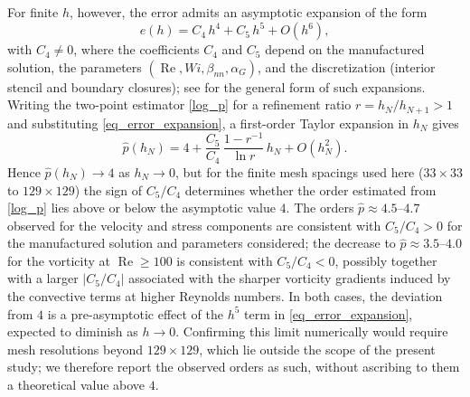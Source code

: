 \documentclass[preprint, 12pt]{elsarticle}
\begin{document}
For finite $h$, however, the error admits an asymptotic expansion of the form
\begin{equation}
    e(h) = C_4\, h^4 + C_5\, h^5 + O\left(h^6\right), \label{eq_error_expansion}
\end{equation}
with $C_4\neq0$, where the coefficients $C_4$ and $C_5$ depend on the manufactured solution, the parameters $(\operatorname{Re}, Wi, \beta_{nn}, \alpha_G)$, and the discretization (interior stencil and boundary closures); see \citet{leveque2007finite} for the general form of such expansions. Writing the two-point estimator \eqref{log_p} for a refinement ratio $r=h_N/h_{N+1}>1$ and substituting \eqref{eq_error_expansion}, a first-order Taylor expansion in $h_N$ gives
\begin{equation}
    \widehat{p}(h_N) = 4 + \frac{C_5}{C_4}\,\frac{1-r^{-1}}{\ln r}\,h_N + O\left(h_N^2\right). \label{eq_order_expansion}
\end{equation}
Hence $\widehat{p}(h_N)\to4$ as $h_N\to0$, but for the finite mesh spacings used here ($33\times33$ to $129\times129$) the sign of $C_5/C_4$ determines whether the order estimated from \eqref{log_p} lies above or below the asymptotic value $4$. The orders $\widehat{p}\approx4.5$--$4.7$ observed for the velocity and stress components are consistent with $C_5/C_4>0$ for the manufactured solution and parameters considered; the decrease to $\widehat{p}\approx3.5$--$4.0$ for the vorticity at $\operatorname{Re}\geq100$ is consistent with $C_5/C_4<0$, possibly together with a larger $\left|C_5/C_4\right|$ associated with the sharper vorticity gradients induced by the convective terms at higher Reynolds numbers. In both cases, the deviation from $4$ is a pre-asymptotic effect of the $h^5$ term in \eqref{eq_error_expansion}, expected to diminish as $h\to0$. Confirming this limit numerically would require mesh resolutions beyond $129\times129$, which lie outside the scope of the present study; we therefore report the observed orders as such, without ascribing to them a theoretical value above $4$.
\end{document}

